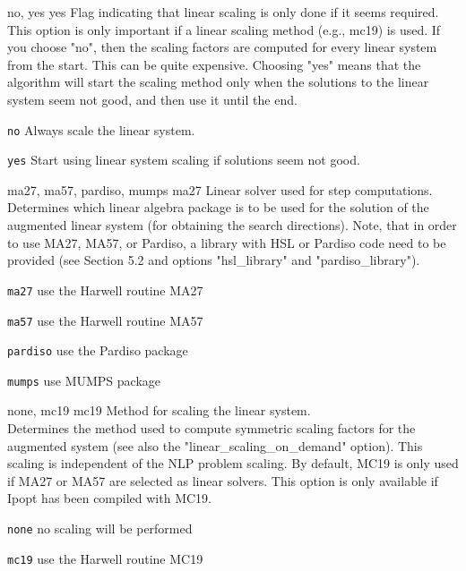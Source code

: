 %
{no, yes}%
{yes}%
{Flag indicating that linear scaling is only done if it seems required.\\
This option is only important if a linear scaling method (e.g., mc19) is used.  If you choose "no", then the scaling factors are computed for every linear system from the start.  This can be quite expensive. Choosing "yes" means that the algorithm will start the scaling method only when the solutions to the linear system seem not good, and then use it until the end.}%
{\begin{list}{}{
\setlength{\parsep}{0em}
\setlength{\leftmargin}{5ex}
\setlength{\labelwidth}{2ex}
\setlength{\itemindent}{0ex}
\setlength{\topsep}{0pt}}
\item[\texttt{no}] Always scale the linear system.
\item[\texttt{yes}] Start using linear system scaling if solutions seem not good.
\end{list}
}

%
{ma27, ma57, pardiso, mumps}%
{ma27}%
{Linear solver used for step computations.\\
Determines which linear algebra package is to be used for the solution of the augmented linear system (for obtaining the search directions). Note, that in order to use MA27, MA57, or Pardiso, a library with HSL or Pardiso code need to be provided (see Section 5.2 and options "hsl\_library" and "pardiso\_library").}%
{\begin{list}{}{
\setlength{\parsep}{0em}
\setlength{\leftmargin}{5ex}
\setlength{\labelwidth}{2ex}
\setlength{\itemindent}{0ex}
\setlength{\topsep}{0pt}}
\item[\texttt{ma27}] use the Harwell routine MA27
\item[\texttt{ma57}] use the Harwell routine MA57
\item[\texttt{pardiso}] use the Pardiso package
\item[\texttt{mumps}] use MUMPS package
\end{list}
}

%
{none, mc19}%
{mc19}%
{Method for scaling the linear system.\\
Determines the method used to compute symmetric scaling factors for the augmented system (see also the "linear\_scaling\_on\_demand" option).  This scaling is independent of the NLP problem scaling.  By default, MC19 is only used if MA27 or MA57 are selected as linear solvers. This option is only available if Ipopt has been compiled with MC19.}%
{\begin{list}{}{
\setlength{\parsep}{0em}
\setlength{\leftmargin}{5ex}
\setlength{\labelwidth}{2ex}
\setlength{\itemindent}{0ex}
\setlength{\topsep}{0pt}}
\item[\texttt{none}] no scaling will be performed
\item[\texttt{mc19}] use the Harwell routine MC19
\end{list}
}

